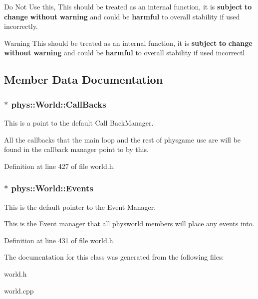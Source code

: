 Do Not Use this, This should be treated as an internal function, it is {\bfseries subject} {\bfseries to} {\bfseries change} {\bfseries without} {\bfseries warning} and could be {\bfseries harmful} to overall stability if used incorrectly. 

\begin{DoxyWarning}{Warning}
This should be treated as an internal function, it is {\bfseries subject} {\bfseries to} {\bfseries change} {\bfseries without} {\bfseries warning} and could be {\bfseries harmful} to overall stability if used incorrectl 
\end{DoxyWarning}


\subsection{Member Data Documentation}
\hypertarget{classphys_1_1World_a22a1624c63198f49fdf8e448881bdb2e}{
\subsubsection[{CallBacks}]{$\ast$ {\bf phys::World::CallBacks}}}
\label{da/ddf/classphys_1_1World_a22a1624c63198f49fdf8e448881bdb2e}


This is a point to the default Call BackManager. 

All the callbacks that the main loop and the rest of physgame use are will be found in the callback manager point to by this. 

Definition at line 427 of file world.h.

\hypertarget{classphys_1_1World_ad0b13f1f3caf0342f56671b522543453}{
\subsubsection[{Events}]{$\ast$ {\bf phys::World::Events}}}
\label{da/ddf/classphys_1_1World_ad0b13f1f3caf0342f56671b522543453}


This is the default pointer to the Event Manager. 

This is the Event manager that all physworld members will place any events into. 

Definition at line 431 of file world.h.



The documentation for this class was generated from the following files:\begin{DoxyCompactItemize}
\item 
world.h\item 
world.cpp\end{DoxyCompactItemize}
